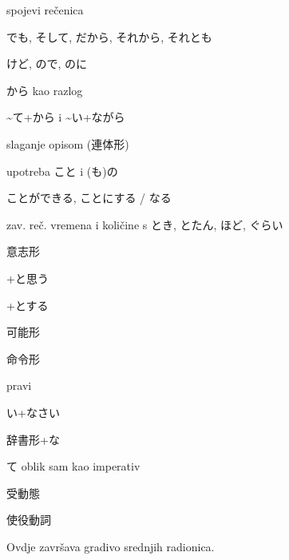 	\begin{hyou}
		\item spojevi rečenica
		\begin{hyou}
			\item でも, そして, だから, それから, それとも
			\item けど, ので, のに
			\item から kao razlog
			\item \textasciitilde て+から i \textasciitilde い+ながら
		\end{hyou}
	\end{hyou}
	\begin{hyou}
		\item slaganje opisom (連体形)
		\begin{hyou}
			\item upotreba こと i (も)の
			\item ことができる, ことにする / なる
			\item zav. reč. vremena i količine s とき, とたん, ほど, ぐらい
		\end{hyou}
		\item 意志形
		\begin{hyou}
			\item +と思う
			\item +とする
		\end{hyou}
		\item 可能形
		\item 命令形
		\begin{hyou}
			\item pravi
			\item い+なさい
			\item 辞書形+な
			\item て oblik sam kao imperativ
		\end{hyou}
		\item 受動態
		\item 使役動詞
	\end{hyou}
Ovdje završava gradivo srednjih radionica.
